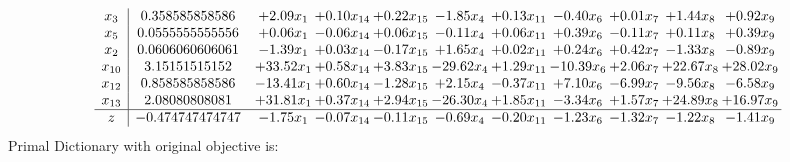 \documentclass[9pt]{article}
\begin{document}
\[\begin{array}{c| c c@{\hskip 2pt} c@{\hskip 2pt} c@{\hskip 2pt} c@{\hskip 2pt} c@{\hskip 2pt} c@{\hskip 2pt} c@{\hskip 2pt} c@{\hskip 2pt} c@{\hskip 2pt} }
 x_{3}   &  0.358585858586 & +  2.09 x_{1} & +  0.10 x_{14} & +  0.22 x_{15} & -1.85 x_{4} & +  0.13 x_{11} & -0.40 x_{6} & +  0.01 x_{7} & +  1.44 x_{8} & +  0.92 x_{9}\\
 x_{5}   &  0.0555555555556 & +  0.06 x_{1} & -0.06 x_{14} & +  0.06 x_{15} & -0.11 x_{4} & +  0.06 x_{11} & +  0.39 x_{6} & -0.11 x_{7} & +  0.11 x_{8} & +  0.39 x_{9}\\
 x_{2}   &  0.0606060606061 & -1.39 x_{1} & +  0.03 x_{14} & -0.17 x_{15} & +  1.65 x_{4} & +  0.02 x_{11} & +  0.24 x_{6} & +  0.42 x_{7} & -1.33 x_{8} & -0.89 x_{9}\\
 x_{10}   &  3.15151515152 & + 33.52 x_{1} & +  0.58 x_{14} & +  3.83 x_{15} & -29.62 x_{4} & +  1.29 x_{11} & -10.39 x_{6} & +  2.06 x_{7} & + 22.67 x_{8} & + 28.02 x_{9}\\
 x_{12}   &  0.858585858586 & -13.41 x_{1} & +  0.60 x_{14} & -1.28 x_{15} & +  2.15 x_{4} & -0.37 x_{11} & +  7.10 x_{6} & -6.99 x_{7} & -9.56 x_{8} & -6.58 x_{9}\\
 x_{13}   &  2.08080808081 & + 31.81 x_{1} & +  0.37 x_{14} & +  2.94 x_{15} & -26.30 x_{4} & +  1.85 x_{11} & -3.34 x_{6} & +  1.57 x_{7} & + 24.89 x_{8} & + 16.97 x_{9}\\
\hline
z    &  -0.474747474747 & -1.75 x_{1} & -0.07 x_{14} & -0.11 x_{15} & -0.69 x_{4} & -0.20 x_{11} & -1.23 x_{6} & -1.32 x_{7} & -1.22 x_{8} & -1.41 x_{9}\\
\end{array}\]
Primal Dictionary with original objective is:
\end{document}

